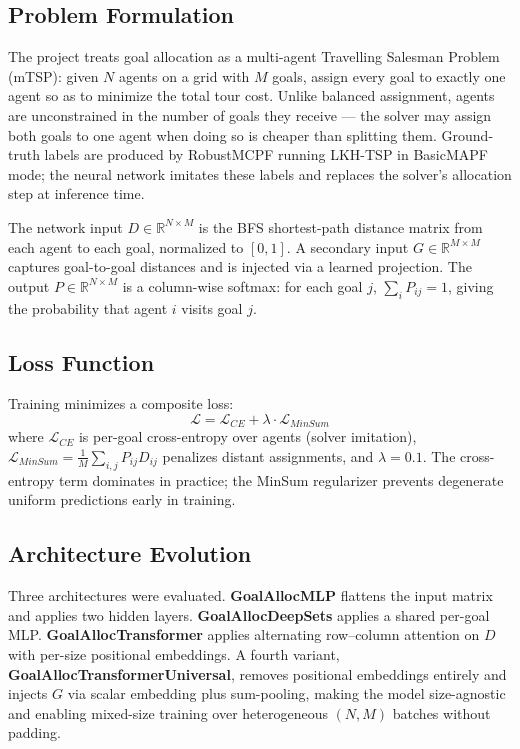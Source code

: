 \documentclass[11pt,a4paper]{article}
\begin{document}
\subsection{Problem Formulation}

The project treats goal allocation as a multi-agent Travelling Salesman Problem (mTSP): given
$N$ agents on a grid with $M$ goals, assign every goal to exactly one agent so as to minimize
the total tour cost. Unlike balanced assignment, agents are unconstrained in the number of goals
they receive --- the solver may assign both goals to one agent when doing so is cheaper than
splitting them. Ground-truth labels are produced by RobustMCPF running LKH-TSP in BasicMAPF
mode; the neural network imitates these labels and replaces the solver's allocation step at
inference time.

The network input $D \in \mathbb{R}^{N \times M}$ is the BFS shortest-path distance matrix
from each agent to each goal, normalized to $[0,1]$. A secondary input $G \in \mathbb{R}^{M \times M}$
captures goal-to-goal distances and is injected via a learned projection. The output
$P \in \mathbb{R}^{N \times M}$ is a column-wise softmax: for each goal $j$,
$\sum_i P_{ij} = 1$, giving the probability that agent $i$ visits goal $j$.

\subsection{Loss Function}

Training minimizes a composite loss:
\[
\mathcal{L} = \mathcal{L}_{CE} + \lambda \cdot \mathcal{L}_{MinSum}
\]
\noindent where $\mathcal{L}_{CE}$ is per-goal cross-entropy over agents (solver imitation),
$\mathcal{L}_{MinSum} = \frac{1}{M}\sum_{i,j} P_{ij} D_{ij}$ penalizes distant assignments,
and $\lambda = 0.1$. The cross-entropy term dominates in practice; the MinSum regularizer
prevents degenerate uniform predictions early in training.

\subsection{Architecture Evolution}

Three architectures were evaluated. \textbf{GoalAllocMLP} flattens the input matrix and applies
two hidden layers. \textbf{GoalAllocDeepSets} applies a shared per-goal MLP.
\textbf{GoalAllocTransformer} applies alternating row--column attention on $D$ with per-size
positional embeddings. A fourth variant, \textbf{GoalAllocTransformerUniversal}, removes
positional embeddings entirely and injects $G$ via scalar embedding plus sum-pooling, making
the model size-agnostic and enabling mixed-size training over heterogeneous $(N,M)$ batches
without padding.
\end{document}
